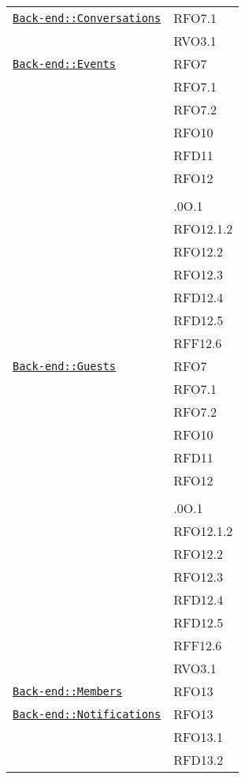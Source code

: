 \begin{longtable}{|>{\centering}m{10cm}|m{3cm}<{\centering}|}
\hyperref[Back-end::Conversations]{\texttt{Back-end::Conversations}} & RFO7.1\\
& RVO3.1\\ \hline

\hyperref[Back-end::Events]{\texttt{Back-end::Events}} & RFO7\\
& RFO7.1\\
& RFO7.2\\
& RFO10\\
& RFD11\\
& RFO12\\
& \\
& .0O.1\\
& RFO12.1.2\\
& RFO12.2\\
& RFO12.3\\
& RFD12.4\\
& RFD12.5\\
& RFF12.6\\ \hline

\hyperref[Back-end::Guests]{\texttt{Back-end::Guests}} & RFO7\\
& RFO7.1\\
& RFO7.2\\
& RFO10\\
& RFD11\\
& RFO12\\
& \\
& .0O.1\\
& RFO12.1.2\\
& RFO12.2\\
& RFO12.3\\
& RFD12.4\\
& RFD12.5\\
& RFF12.6\\
& RVO3.1\\ \hline

\hyperref[Back-end::Members]{\texttt{Back-end::Members}} & RFO13\\ \hline

\hyperref[Back-end::Notifications]{\texttt{Back-end::Notifications}} & RFO13\\
& RFO13.1\\
& RFD13.2\\ \hline


\end{longtable}
